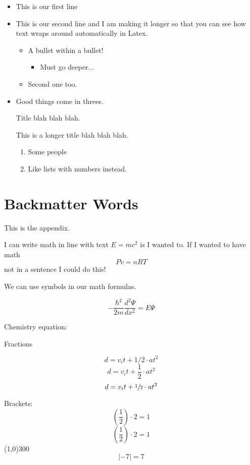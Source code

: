 \documentclass{article}
\begin{document}
\begin{itemize}
	\item This is our first line
	\item This is our second line and I am making it longer so that you can see how text wraps around automatically in Latex.
	\begin{itemize}
		\item A bullet within a bullet!
			\begin{itemize}
				\item Must go deeper...
			\end{itemize}
		\item Second one too.
	\end{itemize}
	\item Good things come in threes.
	\item [Title] blah blah blah.
	\item[This is a longer title] blah blah blah.
	\begin{enumerate}
		\item Some people
		\item Like lists with numbers instead.
	\end{enumerate}
\end{itemize}

\cleardoublepage


\cleardoublepage

\appendix
\section{Backmatter Words}
This is the appendix.

I can write math in line with text $E=mc^2$ is I wanted to. If I wanted to have math $$Pv = nRT$$ not in a sentence I could do this!

We can use symbols in our math formulas.

$$-\frac{\hbar^2}{2m} \frac{d^2\Psi}{dx^2} = E\Psi$$

Chemistry equation:


Fractions

$$d = v_it + 1/2 \cdot at^2$$
$$d = v_it + \frac{1}{2} \cdot at^2$$
$$d = v_it + \sfrac{1}{2} \cdot at^2$$

Brackets:
$$(\frac{1}{2}) \cdot 2 = 1$$
$$\left(\frac{1}{2}\right) \cdot 2 = 1$$ 
\centering
\line(1,0){300}
$$\left|-7 \right| = 7$$
\end{document}
